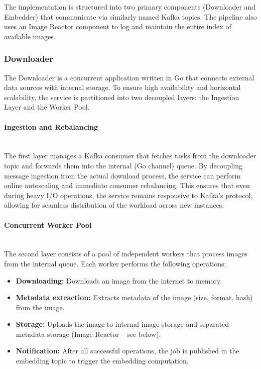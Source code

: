 The implementation is structured into two primary components (Downloader and Embedder) that communicate via similarly named Kafka topics. The pipeline also uses an Image Reactor component to log and maintain the entire index of available images.

\subsubsection{Downloader}
The Downloader is a concurrent application written in Go that connects external data sources with internal storage. To ensure high availability and horizontal scalability, the service is partitioned into two decoupled layers: the Ingestion Layer and the Worker Pool.

\paragraph{Ingestion and Rebalancing} \mbox{} \\
The first layer manages a Kafka consumer that fetches tasks from the downloader topic and forwards them into the internal (Go channel) queue. By decoupling message ingestion from the actual download process, the service can perform online autoscaling and immediate consumer rebalancing. This ensures that even during heavy I/O operations, the service remains responsive to Kafka’s protocol, allowing for seamless distribution of the workload across new instances.

\paragraph{Concurrent Worker Pool} \mbox{} \\
The second layer consists of a pool of independent workers that process images from the internal queue. Each worker performs the following operations:
\begin{itemize}
    \item \textbf{Downloading:} Downloads an image from the internet to memory.
    \item \textbf{Metadata extraction:} Extracts metadata of the image (size, format, hash) from the image.
    \item \textbf{Storage:} Uploads the image to internal image storage and separated metadata storage (Image Reactor -- see below).
    \item \textbf{Notification:} After all successful operations, the job is published in the embedding topic to trigger the embedding computation.
\end{itemize}

